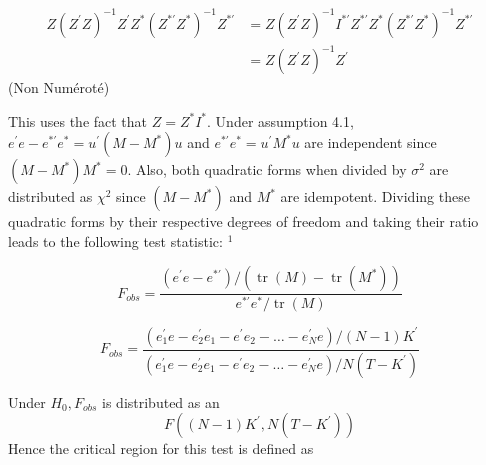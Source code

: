 \documentclass[
]{book}
\begin{document}
\begin{equation}
\begin{aligned}
Z\left(Z^{\prime} Z\right)^{-1} Z^{\prime} Z^{*}\left(Z^{* \prime} Z^{*}\right)^{-1} Z^{* \prime} &=Z\left(Z^{\prime} Z\right)^{-1} I^{* \prime} Z^{* \prime} Z^{*}\left(Z^{* \prime} Z^{*}\right)^{-1} Z^{* \prime} \\
&=Z\left(Z^{\prime} Z\right)^{-1} Z^{\prime}
\end{aligned}
\end{equation} (Non Numéroté)

This uses the fact that \(Z=Z^{*} I^{*} .\) Under assumption 4.1, \(e^{\prime} e-e^{* \prime} e^{*}=u^{\prime}\left(M-M^{*}\right) u\) and \(e^{* \prime} e^{*}=u^{\prime} M^{*} u\) are independent since \(\left(M-M^{*}\right) M^{*}=0 .\) Also, both quadratic forms when divided by \(\sigma^{2}\) are distributed as \(\chi^{2}\) since \(\left(M-M^{*}\right)\) and \(M^{*}\) are idempotent. Dividing these quadratic forms by their respective degrees of freedom and taking their ratio leads to the following test statistic: \({ }^{1}\)

\[F_{obs}=\frac{\left(e^{\prime}e-e^{* \prime} \right) / \left( \operatorname{tr}\left(M\right)-\operatorname{tr}\left(M^*\right) \right)}
{e^{* \prime}e^* / \operatorname{tr}\left(M\right) }  \]

\begin{equation}
F_{obs}=\frac{\left(e_1^{\prime}e-e_2^{\prime}e_1 -e^{\prime}e_2 -\ldots -e_N^{\prime}e \right)/ \left(N-1 \right) K^{\prime}  }
{\left(e_1^{\prime}e-e_2^{\prime}e_1 -e^{\prime}e_2 -\ldots -e_N^{\prime}e \right)/ N \left(T-K^{\prime} \right) } 
\end{equation}

Under \(H_0,F_{obs}\) is distributed as an \[F \left(\left(N-1 \right)K^{\prime}, N\left(T-K^{\prime}\right)\right) \] Hence the critical region for this test is defined as
\end{document}
